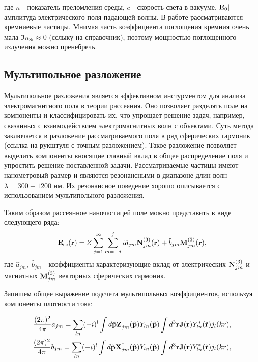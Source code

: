где $n$ - показатель преломления среды, $c$ - скорость света в вакууме,$\left| \vb{E}_0 \right|$ - амплитуда электрического поля падающей волны.
В работе рассматриваются кремниевые частицы. Мнимая часть коэффициента поглощения кремния очень мала $\Im{n_{\text{Si}}} \approx 0$ (сслыку на справочник), поэтому мощностью поглощенного излучения можно пренебречь. 

\subsection{Мультипольное разложение}\label{subsec:mult_decomp}

Мультипольное разложения является эффективном инстурментом для анализа электромагнитного поля в теории рассеяния. Оно позволяет разделять поле на компоненты и классифицировать их, что упрощает решение задач, например, связанных с взаимодействием электромагнитных волн с объектами. Суть метода заключается в разложение рассматриваемого поля в ряд сферических гармоник (ссылка на  рукштуля с точным разложением). Такое разложение позволяет выделить компоненты вносящие главный вклад в общее распределение поля и упростить решение поставленной задачи.
Рассматриваемые частицы имеют нанометровый размер и являются резонансными в диапазоне длин волн $\lambda = 300-1200$ нм. Их резонансное поведение хорошо описывается с использованием мультипольного разложения. 

Таким образом рассеянное наночастицей поле можно представить в виде следующего ряда:
\begin{equation}
    \vb{E}_{\text{sc}} (\vb{r}) = Z \sum_{j=1}^{\infty} \sum_{m=-j}^{j} i \hat{a}_{jm} \vb{N}_{jm}^{(3)}(\vb{r}) + \hat{b}_{jm} \vb{M}_{jm}^{(3)} (\vb{r}),\label{eq:multipolar_field}
\end{equation}
где $\hat{a}_{jm},\;\hat{b}_{jm}$ - коэффициенты характеризующие вклад от электрических $\vb{N}_{jm}^{(3)}$ и магнитных $\vb{M}_{jm}^{(3)}$ векторных сферических гармоник. 

Запишем общее выражение подсчета мультипольных коэффициентов, используя компоненты плотности тока:

\begin{align}
    \frac{(2\pi)^2}{4\pi} a_{jm} = \sum_{ln} (-i)^l \int d \hat{\vb{p}} \vb{Z}^{\dag}_{jm}(\hat{\vb{p}}) Y_{ln}(\hat{\vb{p}}) \int d^3 \vb{r} \vb{J}(\vb{r}) Y_{ln}^* (\hat{\vb{r}}) j_l(kr),\\
    \frac{(2\pi)^2}{4\pi} b_{jm} = \sum_{ln} (-i)^l \int d \hat{\vb{p}} \vb{X}^{\dag}_{jm}(\hat{\vb{p}}) Y_{ln}(\hat{\vb{p}}) \int d^3 \vb{r} \vb{J}(\vb{r}) Y_{ln}^* (\hat{\vb{r}}) j_l(kr),
\end{align}

